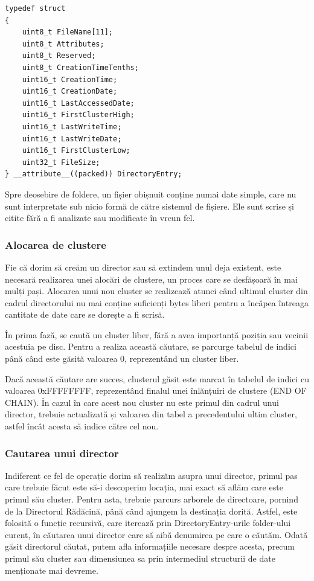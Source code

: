 \bigskip

\lstset{style=code-snyppet-style}
\begin{lstlisting}
typedef struct
{
    uint8_t FileName[11];
    uint8_t Attributes;
    uint8_t Reserved;
    uint8_t CreationTimeTenths;
    uint16_t CreationTime;
    uint16_t CreationDate;
    uint16_t LastAccessedDate;
    uint16_t FirstClusterHigh;
    uint16_t LastWriteTime;
    uint16_t LastWriteDate;
    uint16_t FirstClusterLow;
    uint32_t FileSize;
} __attribute__((packed)) DirectoryEntry;
\end{lstlisting}

\bigskip

Spre deosebire de foldere, un fișier obișnuit conține numai date simple, care nu sunt interpretate sub nicio formă de către sistemul de fișiere. Ele sunt scrise și citite fără a fi analizate sau modificate în vreun fel.


\subsubsection{Alocarea de clustere}

Fie că dorim să creăm un director sau să extindem unul deja existent, este necesară realizarea unei alocări de clustere, un proces care se desfășoară în mai mulți pași. Alocarea unui nou cluster se realizează atunci când ultimul cluster din cadrul directorului nu mai conține suficienți bytes liberi pentru a încăpea întreaga cantitate de date care se dorește a fi scrisă.

În prima fază, se caută un cluster liber, fără a avea importanță poziția sau vecinii acestuia pe disc. Pentru a realiza această căutare, se parcurge tabelul de indici până când este găsită valoarea 0, reprezentând un cluster liber.

Dacă această căutare are succes, clusterul găsit este marcat în tabelul de indici cu valoarea 0xFFFFFFFF, reprezentând finalul unei înlănțuiri de clustere (END OF CHAIN). În cazul în care acest nou cluster nu este primul din cadrul unui director, trebuie actualizată și valoarea din tabel a precedentului ultim cluster, astfel încât acesta să indice către cel nou.


\subsubsection{Cautarea unui director}

Indiferent ce fel de operație dorim să realizăm asupra unui director, primul pas care trebuie făcut este să-i descoperim locația, mai exact să aflăm care este primul său cluster. Pentru asta, trebuie parcurs arborele de directoare, pornind de la Directorul Rădăcină, până când ajungem la destinația dorită. Astfel, este folosită o funcție recursivă, care iterează prin DirectoryEntry-urile folder-ului curent, în căutarea unui director care să aibă denumirea pe care o căutăm. Odată găsit directorul căutat, putem afla informațiile necesare despre acesta, precum primul său cluster sau dimensiunea sa prin intermediul structurii de date menționate mai devreme.


